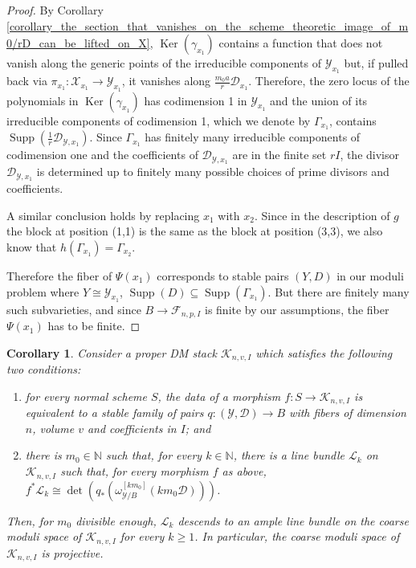 \documentclass{amsart}
\newcommand{\sF}{\mathscr{F}}
\newcommand{\cD}{\mathcal{D}}
\newcommand{\cK}{\mathcal{K}}
\newcommand{\cL}{\mathcal{L}}
\newcommand{\cX}{\mathcal{X}}
\newcommand{\cY}{\mathcal{Y}}
\newcommand{\supp}{\operatorname{Supp}}
\newcommand{\Ker}{\operatorname{Ker}}
\newtheorem{Cor}[theorem]{Corollary}
\theoremstyle{definition}
\DeclareMathOperator{\Supp}{Supp}
\begin{document}
\begin{proof}
By Corollary \ref{corollary_the_section_that_vanishes_on_the_scheme_theoretic_image_of_m0/rD_can_be_lifted_on_X}, $\Ker(\gamma_{x_1})$ contains a function that does not vanish along the generic points of the irreducible components of $\cY_{x_1}$ but, if pulled back via $\pi_{x_1} \colon \cX_{x_1}\to \cY_{x_1}$, it vanishes along $\frac{m_0a}{r}\cD_{x_1}$.
Therefore, the zero locus of the polynomials in $\Ker(\gamma_{x_1})$ has codimension 1 in $\cY_{x_1}$ and the union of its irreducible components of codimension 1, which we denote by $\Gamma_{x_1}$, contains $\supp(\frac{1}{r}\cD_{\cY,x_1})$.
Since $\Gamma_{x_1}$ has finitely many irreducible components of codimension one and the coefficients of $\cD_{\cY,x_1}$ are in the finite set $rI$, the divisor $\cD_{\cY,x_1}$ is determined up to finitely many possible choices of prime divisors and coefficients. 

A similar conclusion holds by replacing $x_1$ with $x_2$. Since in the description of $g$ the block at position (1,1) is the same as the block at position (3,3), we also know that $h(\Gamma_{x_1}) = \Gamma_{x_2}$.

Therefore the fiber of $\Psi(x_1)$ corresponds to stable pairs $(Y,D)$ in our moduli problem where $Y\cong \cY_{x_1}$, $\Supp(D)\subseteq \Supp(\Gamma_{x_1})$.
But there are finitely many such subvarieties, and since $B\to \sF_{n,p,I}$ is finite by our assumptions, the fiber $\Psi(x_1)$ has to be finite.
\end{proof}

\begin{Cor} \label{cor proj moduli}
Consider a proper DM stack $ \cK_{n,v,I}$ which satisfies the following two conditions:
\begin{enumerate}
    \item for every normal scheme $S$, the data of a morphism $f \colon S\to \cK_{n,v,I}$ is equivalent to a stable family of pairs $q \colon (\cY,\cD)\to B$ with fibers of dimension $n$, volume $v$ and coefficients in $I$; and
    \item there is $m_0\in \mathbb{N}$ such that, for every $k \in \mathbb{N}$, there is a line bundle $\cL_k$ on $\cK_{n,v,I}$ such that, for every morphism $f$ as above, $f^*\cL_k \cong \det(q_*(\omega_{\cY/B}^{[km_0]}(km_0\cD)))$.
\end{enumerate}
Then, for $m_0$ divisible enough, $\cL_k$ descends to an ample line bundle on the coarse moduli space of $\cK_{n,v,I}$ for every $k\ge 1$. In particular, the coarse moduli space of $\cK_{n,v,I}$ is projective. 
\end{Cor}
\end{document}
